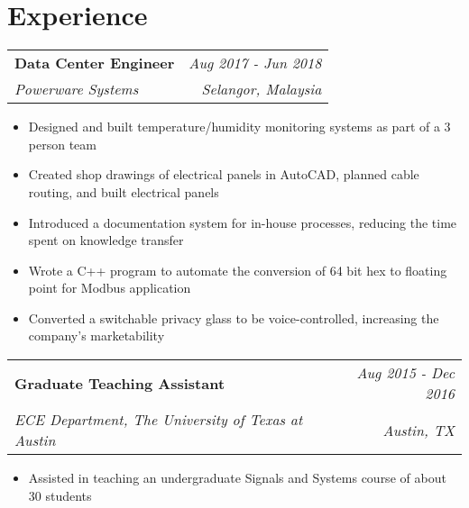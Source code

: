 \documentclass[letterpaper,11pt]{article}
\makeatletter
\newcommand{\JobSubheading}[4]{
  \vspace{-1pt}
    \begin{tabular*}{\textwidth}[t]{l@{\extracolsep{\fill}}r}
      \textbf {#1} & \textit{#2}  \\
      \textit{#3} & \textit{#4} \\
    \end{tabular*}\vspace{-5pt}
}
\makeatother
\begin{document}
\section{\color{BlueViolet} Experience}
    \vspace{-2pt}
    \JobSubheading
      {Data Center Engineer}{Aug 2017 - Jun 2018}
      {Powerware Systems}{Selangor, Malaysia}
      \vspace{-1pt}
        \begin{itemize}
            \item Designed and built temperature/humidity monitoring systems as part of a 3 person team
            \vspace{-3pt}
            \item Created shop drawings of electrical panels in AutoCAD, planned cable routing, and built electrical panels
            \vspace{-3pt}
            \item Introduced a documentation system for in-house processes, reducing the time spent on knowledge transfer 
	\vspace{-3pt}
	\item Wrote a C++ program to automate the conversion of 64 bit hex to floating point for Modbus application
          \vspace{-3pt}
	\item Converted a switchable privacy glass to be voice-controlled, increasing the company's marketability

        \end{itemize}
    \vspace{0pt}

    \JobSubheading
       {Graduate Teaching Assistant}{Aug 2015 - Dec 2016}
      {ECE Department, The University of Texas at Austin}{Austin, TX}
      \vspace{-1pt}
      \begin{itemize}
        \item Assisted in teaching an undergraduate Signals and Systems course of about 30 students
    \end{itemize}
    \vspace{-2pt}
 
\end{document}
